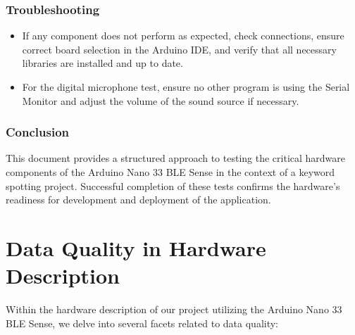 \subsubsection{Troubleshooting}

\begin{itemize}
	\item If any component does not perform as expected, check connections, ensure correct board selection in the Arduino IDE, and verify that all necessary libraries are installed and up to date.
	\item For the digital microphone test, ensure no other program is using the Serial Monitor and adjust the volume of the sound source if necessary.
\end{itemize}

\subsubsection{Conclusion}

This document provides a structured approach to testing the critical hardware components of the Arduino Nano 33 BLE Sense in the context of a keyword spotting project. Successful completion of these tests confirms the hardware's readiness for development and deployment of the application.

\section{Data Quality in Hardware Description}

Within the hardware description of our project utilizing the Arduino Nano 33 BLE Sense, we delve into several facets related to data quality:

